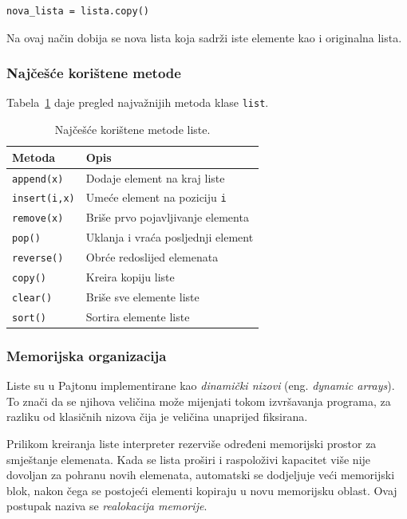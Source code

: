\begin{verbatim}
nova_lista = lista.copy()
\end{verbatim}

Na ovaj način dobija se nova lista koja sadrži iste elemente kao i originalna lista.

\subsubsection*{Najčešće korištene metode}

Tabela~\ref{tab:list_methods} daje pregled najvažnijih metoda klase \texttt{list}.

\begin{table}[H]
	\centering
	\caption{Najčešće korištene metode liste.}
	\label{tab:list_methods}
	\begin{tabular}{l|l}
		\hline
		\textbf{Metoda} & \textbf{Opis} \\ \hline
		\texttt{append(x)} & Dodaje element na kraj liste \\
		\texttt{insert(i,x)} & Umeće element na poziciju \texttt{i} \\
		\texttt{remove(x)} & Briše prvo pojavljivanje elementa \\
		\texttt{pop()} & Uklanja i vraća posljednji element \\
		\texttt{reverse()} & Obrće redoslijed elemenata \\
		\texttt{copy()} & Kreira kopiju liste \\
		\texttt{clear()} & Briše sve elemente liste \\
		\texttt{sort()} & Sortira elemente liste \\
		\hline
	\end{tabular}
\end{table}

\subsubsection*{Memorijska organizacija}

Liste su u Pajtonu implementirane kao \textit{dinamički nizovi} (eng. \textit{dynamic arrays}). To znači da se njihova veličina može mijenjati tokom izvršavanja programa, za razliku od klasičnih nizova čija je veličina unaprijed fiksirana.

Prilikom kreiranja liste interpreter rezerviše određeni memorijski prostor za smještanje elemenata. Kada se lista proširi i raspoloživi kapacitet više nije dovoljan za pohranu novih elemenata, automatski se dodjeljuje veći memorijski blok, nakon čega se postojeći elementi kopiraju u novu memorijsku oblast. Ovaj postupak naziva se \textit{realokacija memorije}.

